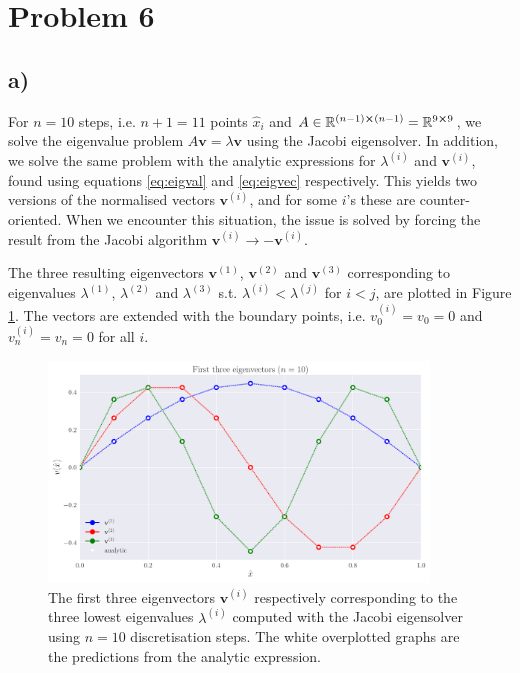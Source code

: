 \documentclass[english,notitlepage,nofootinbib]{revtex4-1}  %
\renewcommand{\vec}{\mathbf}
\begin{document}
\section*{Problem 6}

\subsection*{a)}

For $n=10$ steps, i.e. $n+1=11$ points $\hat{x}_i$ and $A\in\mathbb{R}^{(n-1)\cross(n-1)} =\mathbb{R}^{9\cross 9}$, we solve the eigenvalue problem $A\vec{v} = \lambda \vec{v}$ using the Jacobi eigensolver. In addition, we solve the same problem with the analytic expressions for $\lambda^{(i)}$ and $\vec{v}^{(i)}$, found using equations \ref{eq:eigval} and \ref{eq:eigvec} respectively. This yields two versions of the normalised vectors $\vec{v}^{(i)}$, and for some $i$'s these are counter-oriented. When we encounter this situation, the issue is solved by forcing the result from the Jacobi algorithm $\vec{v}^{(i)} \rightarrow - \vec{v}^{(i)}$.

The three resulting eigenvectors $\vec{v}^{(1)}$, $\vec{v}^{(2)}$ and $\vec{v}^{(3)}$ corresponding to eigenvalues $\lambda^{(1)}$, $\lambda^{(2)}$ and $\lambda^{(3)}$ s.t. $\lambda^{(i)}<\lambda^{(j)}$ for $i<j$, are plotted in Figure \ref{fig:p6_solution_10steps}. The vectors are extended with the boundary points, i.e. $v_0^{(i)}=v_0 = 0$ and $v_n^{(i)}=v_n=0$ for all $i$.


\begin{figure}[h!]
    \centering
    \includegraphics[width=0.9\textwidth]{solution_10steps.pdf}
    \caption{The first three eigenvectors $\vec{v}^{(i)}$ respectively corresponding to the three lowest eigenvalues $\lambda^{(i)}$ computed with the Jacobi eigensolver using $n=10$ discretisation steps. The white overplotted graphs are the predictions from the analytic expression.}\label{fig:p6_solution_10steps}
\end{figure}
\end{document}
